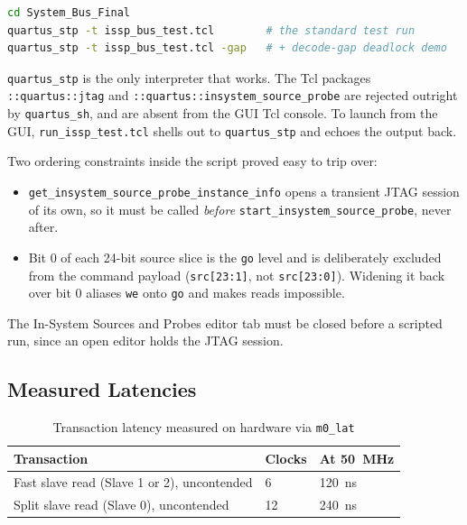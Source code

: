 \documentclass[11pt,a4paper]{article}
\newcommand{\sig}[1]{\texttt{#1}}
\begin{document}
\begin{lstlisting}[language=bash, caption={Running the hardware tests},
                   basicstyle=\ttfamily\small, numbers=none]
cd System_Bus_Final
quartus_stp -t issp_bus_test.tcl        # the standard test run
quartus_stp -t issp_bus_test.tcl -gap   # + decode-gap deadlock demo
\end{lstlisting}

\sig{quartus\_stp} is the only interpreter that works. The Tcl packages
\sig{::quartus::jtag} and \sig{::quartus::insystem\_source\_probe} are
rejected outright by \sig{quartus\_sh}, and are absent from the GUI Tcl
console. To launch from the GUI,
\sig{run\_issp\_test.tcl} shells out to \sig{quartus\_stp} and echoes the output
back.

Two ordering constraints inside the script proved easy to trip over:

\begin{itemize}
    \item \sig{get\_insystem\_source\_probe\_instance\_info} opens a transient
          JTAG session of its own, so it must be called \emph{before}
          \sig{start\_insystem\_source\_probe}, never after.
    \item Bit 0 of each 24-bit source slice is the \sig{go} level and is
          deliberately excluded from the command payload
          (\sig{src[23:1]}, not \sig{src[23:0]}). Widening it back over bit 0
          aliases \sig{we} onto \sig{go} and makes reads impossible.
\end{itemize}

The In-System Sources and Probes editor tab must be closed before a scripted
run, since an open editor holds the JTAG session.

\subsection{Measured Latencies}

\begin{table}[htbp]
\centering
\caption{Transaction latency measured on hardware via \sig{m0\_lat}}
\label{tab:latency}
\small
\begin{tabular}{lll}
\toprule
\textbf{Transaction} & \textbf{Clocks} & \textbf{At 50~MHz} \\
\midrule
Fast slave read (Slave 1 or 2), uncontended & 6  & 120~ns \\
Split slave read (Slave 0), uncontended     & 12 & 240~ns \\
\bottomrule
\end{tabular}
\end{table}
\end{document}
